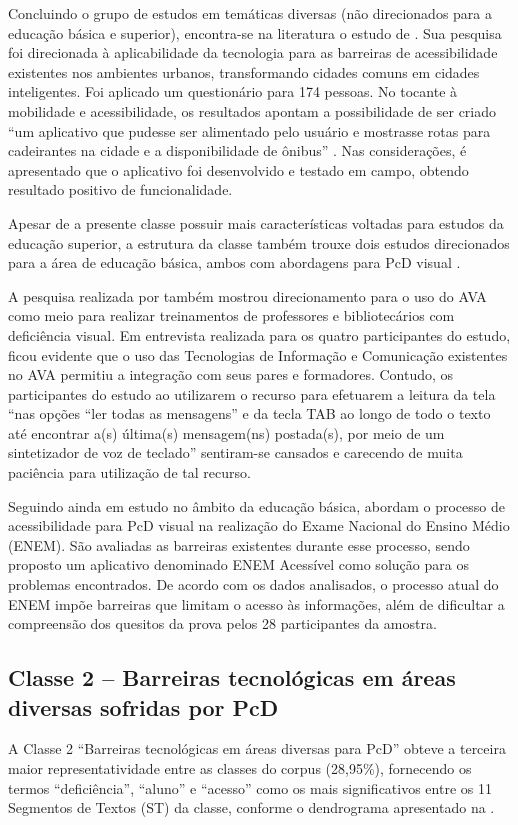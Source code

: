 \documentclass{textolivre}
\begin{document}
Concluindo o grupo de estudos em temáticas diversas (não direcionados para a educação básica e superior), encontra-se na literatura o estudo de \textcite{alperstedtneto2018}. Sua pesquisa foi direcionada à aplicabilidade da tecnologia para as barreiras de acessibilidade existentes nos ambientes urbanos, transformando cidades comuns em cidades inteligentes. Foi aplicado um questionário para 174 pessoas. No tocante à mobilidade e acessibilidade, os resultados apontam a possibilidade de ser criado “um aplicativo que pudesse ser alimentado pelo usuário e mostrasse rotas para cadeirantes na cidade e a disponibilidade de ônibus” \cite[p. 298]{alperstedtneto2018}. Nas considerações, é apresentado que o aplicativo foi desenvolvido e testado em campo, obtendo resultado positivo de funcionalidade.

Apesar de a presente classe possuir mais características voltadas para estudos da educação superior, a estrutura da classe também trouxe dois estudos direcionados para a área de educação básica, ambos com abordagens para PcD visual \cite{estabel2009, leria2018}.

A pesquisa realizada por \textcite{estabel2009} também mostrou direcionamento para o uso do AVA como meio para realizar treinamentos de professores e bibliotecários com deficiência visual. Em entrevista realizada para os quatro participantes do estudo, ficou evidente que o uso das Tecnologias de Informação e Comunicação existentes no AVA permitiu a integração com seus pares e formadores. Contudo, os participantes do estudo ao utilizarem o recurso para efetuarem a leitura da tela “nas opções “ler todas as mensagens” e da tecla TAB ao longo de todo o texto até encontrar a(s) última(s) mensagem(ns) postada(s), por meio de um sintetizador de voz de teclado” \cite[p. 31]{estabel2009} sentiram-se cansados e carecendo de muita paciência para utilização de tal recurso.

Seguindo ainda em estudo no âmbito da educação básica, \textcite{leria2018} abordam o processo de acessibilidade para PcD visual na realização do Exame Nacional do Ensino Médio (ENEM). São avaliadas as barreiras existentes durante esse processo, sendo proposto um aplicativo denominado ENEM Acessível como solução para os problemas encontrados. De acordo com os dados analisados, o processo atual do ENEM impõe barreiras que limitam o acesso às informações, além de dificultar a compreensão dos quesitos da prova pelos 28 participantes da amostra.

\subsection{Classe 2 – Barreiras tecnológicas em áreas diversas sofridas por PcD}
A Classe 2 “Barreiras tecnológicas em áreas diversas para PcD” obteve a terceira maior representatividade entre as classes do corpus (28,95\%), fornecendo os termos “deficiência”, “aluno” e “acesso” como os mais significativos entre os 11 Segmentos de Textos (ST) da classe, conforme o dendrograma apresentado na .
\end{document}
